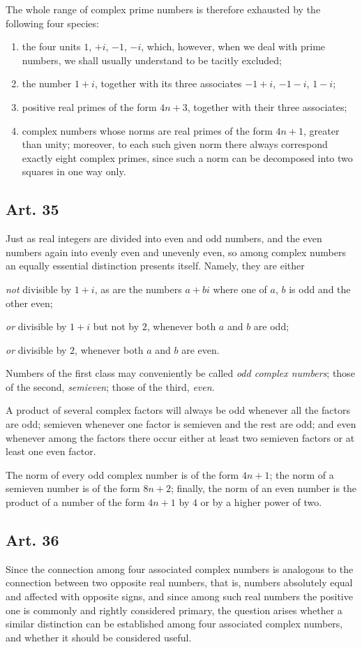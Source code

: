 \documentclass[12pt]{article}
\newcommand{\art}[1]{\subsection*{Art. #1}}
\begin{document}
The whole range of complex prime numbers is therefore exhausted by the following four species:
\begin{enumerate}[label=\arabic*)]
\item the four units $1$, $+i$, $-1$, $-i$, which, however, when we deal with prime numbers, we shall usually understand to be tacitly excluded;
\item the number $1+i$, together with its three associates $-1+i$, $-1-i$, $1-i$;
\item positive real primes of the form $4n+3$, together with their three associates;
\item complex numbers whose norms are real primes of the form $4n+1$, greater than unity; moreover, to each such given norm there always correspond exactly eight complex primes, since such a norm can be decomposed into two squares in one way only.
\end{enumerate}

\art{35}

Just as real integers are divided into even and odd numbers, and the even numbers again into evenly even and unevenly even, so among complex numbers an equally essential distinction presents itself. Namely, they are either

\textit{not} divisible by $1+i$, as are the numbers $a+bi$ where one of $a$, $b$ is odd and the other even;

\textit{or} divisible by $1+i$ but not by $2$, whenever both $a$ and $b$ are odd;

\textit{or} divisible by $2$, whenever both $a$ and $b$ are even.

Numbers of the first class may conveniently be called \textit{odd complex numbers}; those of the second, \textit{semieven}; those of the third, \textit{even}.

A product of several complex factors will always be odd whenever all the factors are odd; semieven whenever one factor is semieven and the rest are odd; and even whenever among the factors there occur either at least two semieven factors or at least one even factor.

The norm of every odd complex number is of the form $4n+1$; the norm of a semieven number is of the form $8n+2$; finally, the norm of an even number is the product of a number of the form $4n+1$ by $4$ or by a higher power of two.

\art{36}

Since the connection among four associated complex numbers is analogous to the connection between two opposite real numbers, that is, numbers absolutely equal and affected with opposite signs, and since among such real numbers the positive one is commonly and rightly considered primary, the question arises whether a similar distinction can be established among four associated complex numbers, and whether it should be considered useful.
\end{document}
